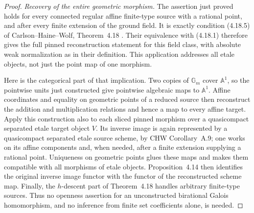 \begin{proof}
\emph{Recovery of the entire geometric morphism.}
The assertion just proved holds for every connected regular affine
finite-type source with a rational point, and after every finite
extension of the ground field. It is exactly condition (4.18.5) of
Carlson--Haine--Wolf, Theorem~4.18 \cite{CHW2024}. Their equivalence
with (4.18.1) therefore gives the full pinned reconstruction statement
for this field class, with absolute weak normalization as in their
definition. This application addresses all etale objects, not just
the point map of one morphism.

Here is the categorical part of that implication. Two copies of
$\mathbb G_m$ cover $\mathbb A^1$, so the pointwise units just
constructed give pointwise algebraic maps to $\mathbb A^1$. Affine
coordinates and equality on geometric points of a reduced source
then reconstruct the addition and multiplication relations and hence
a map to every affine target. Apply this construction also to each
sliced pinned morphism over a quasicompact separated etale target
object $V$. Its inverse image is again represented by a
quasicompact separated etale source scheme, by CHW Corollary~A.9;
one works on its affine components and, when needed, after a finite
extension supplying a rational point. Uniqueness on geometric points
glues these maps and makes them compatible with all morphisms of
etale objects. Proposition~4.14 then identifies the original inverse
image functor with the functor of the reconstructed scheme map.
Finally, the $h$-descent part of Theorem~4.18 handles arbitrary
finite-type sources. Thus no openness assertion for an unconstructed
birational Galois homomorphism, and no inference from finite set
coefficients alone, is needed.

\end{proof}
